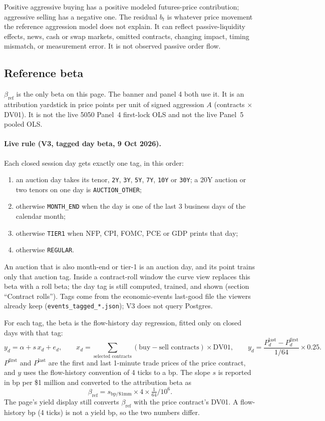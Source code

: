 \documentclass[11pt]{article}
\begin{document}
Positive aggressive buying has a positive modeled futures-price contribution; aggressive selling has a negative one. The residual $b_t$ is whatever price movement the reference aggression model does not explain. It can reflect passive-liquidity effects, news, cash or swap markets, omitted contracts, changing impact, timing mismatch, or measurement error. It is not observed passive order flow.

\subsection{Reference beta}

$\beta_{\mathrm{ref}}$ is the only beta on this page. The banner and panel 4 both use it. It is an attribution yardstick in price points per unit of signed aggression $A$ (contracts $\times$ DV01). It is not the live 5050 Panel~4 first-lock OLS and not the live Panel~5 pooled OLS.

\paragraph{Live rule (V3, tagged day beta, 9 Oct 2026).}
Each closed session day gets exactly one tag, in this order:
\begin{enumerate}
    \item an auction day takes its tenor, \texttt{2Y}, \texttt{3Y}, \texttt{5Y}, \texttt{7Y}, \texttt{10Y} or \texttt{30Y}; a 20Y auction or two tenors on one day is \texttt{AUCTION\_OTHER};
    \item otherwise \texttt{MONTH\_END} when the day is one of the last 3 business days of the calendar month;
    \item otherwise \texttt{TIER1} when NFP, CPI, FOMC, PCE or GDP prints that day;
    \item otherwise \texttt{REGULAR}.
\end{enumerate}
An auction that is also month-end or tier-1 is an auction day, and its point trains only that auction tag. Inside a contract-roll window the curve view replaces this beta with a roll beta; the day tag is still computed, trained, and shown (section ``Contract rolls''). Tags come from the economic-events last-good file the viewers already keep (\texttt{events\_tagged\_*.json}); V3 does not query Postgres.

For each tag, the beta is the flow-history day regression, fitted only on closed days with that tag:
\[
y_d=\alpha+s\,x_d+e_d,\qquad
x_d=\sum_{\text{selected contracts}}(\text{buy}-\text{sell contracts})\times\mathrm{DV01},\qquad
y_d=\frac{P^{\text{last}}_d-P^{\text{first}}_d}{1/64}\times 0.25 .
\]
$P^{\text{first}}$ and $P^{\text{last}}$ are the first and last 1-minute trade prices of the price contract, and $y$ uses the flow-history convention of 4 ticks to a bp. The slope $s$ is reported in bp per \$1 million and converted to the attribution beta as
\[
\beta_{\mathrm{ref}}=s_{\text{bp}/\$1\text{mm}}\times 4\times\tfrac{1}{64}\big/10^6 .
\]
The page's yield display still converts $\beta_{\mathrm{ref}}$ with the price contract's DV01. A flow-history bp (4 ticks) is not a yield bp, so the two numbers differ.
\end{document}
